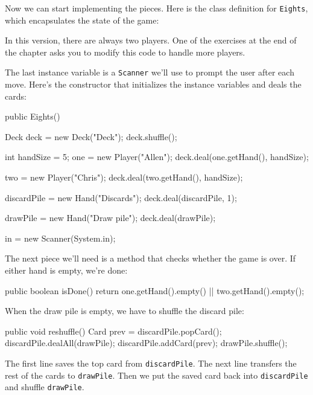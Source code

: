 \documentclass[12pt]{book}
\theoremstyle{exercise}
\newcommand{\java}[1]{\verb"#1"}
\begin{document}
Now we can start implementing the pieces.
Here is the class definition for \java{Eights}, which encapsulates the state of the game:

\begin{code}
public class Eights {

    private Player one;
    private Player two;
    private Hand drawPile;
    private Hand discardPile;
    private Scanner in;
\end{code}

In this version, there are always two players.
One of the exercises at the end of the chapter asks you to modify this code to handle more players.

The last instance variable is a \java{Scanner} we'll use to prompt the user after each move.
Here's the constructor that initializes the instance variables and deals the cards:

\begin{code}
    public Eights() {
        Deck deck = new Deck("Deck");
        deck.shuffle();

        int handSize = 5;
        one = new Player("Allen");
        deck.deal(one.getHand(), handSize);

        two = new Player("Chris");
        deck.deal(two.getHand(), handSize);

        discardPile = new Hand("Discards");
        deck.deal(discardPile, 1);

        drawPile = new Hand("Draw pile");
        deck.deal(drawPile);

        in = new Scanner(System.in);
    }
\end{code}

The next piece we'll need is a method that checks whether the game is over.
If either hand is empty, we're done:

\begin{code}
    public boolean isDone() {
        return one.getHand().empty() || two.getHand().empty();
    }
\end{code}

When the draw pile is empty, we have to shuffle the discard pile:

\begin{code}
    public void reshuffle() {
        Card prev = discardPile.popCard();
        discardPile.dealAll(drawPile);
        discardPile.addCard(prev);
        drawPile.shuffle();
    }
\end{code}

The first line saves the top card from \java{discardPile}.
The next line transfers the rest of the cards to \java{drawPile}.
Then we put the saved card back into \java{discardPile} and shuffle \java{drawPile}.
\end{document}
